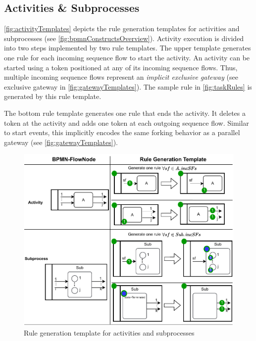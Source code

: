 \documentclass[submission, copyright, creativecommons]{eptcs}
\begin{document}
\subsection{Activities \& Subprocesses}

\autoref{fig:activityTemplates} depicts the rule generation templates for activities and subprocesses (see \cref{fig:bpmnConstructsOverview}).
Activity execution is divided into two steps implemented by two rule templates.
The upper template generates one rule for each incoming sequence flow to start the activity.
An activity can be started using a token positioned at any of its incoming sequence flows.
Thus, multiple incoming sequence flows represent an \textit{implicit exclusive gateway} (see exclusive gateway in \cref{fig:gatewayTemplates}).
The sample rule in \cref{fig:taskRules} is generated by this rule template.

The bottom rule template generates one rule that ends the activity.
It deletes a token at the activity and adds one token at each outgoing sequence flow.
Similar to start events, this implicitly encodes the same forking behavior as a parallel gateway (see \cref{fig:gatewayTemplates}). 

\begin{figure}[h]
    \centering
    \includegraphics[width=1\textwidth]{images/activities_template.pdf}
    \caption{Rule generation template for activities and subprocesses}
    \label{fig:activityTemplates}
\end{figure}
\end{document}
